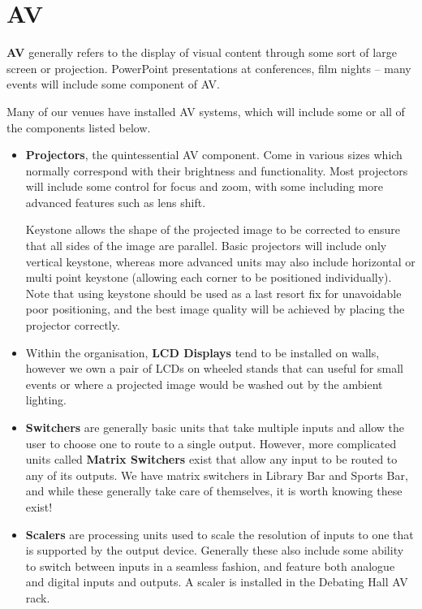 \documentclass[14pt]{article} %
\let\Oldsection\section
\renewcommand{\section}{\FloatBarrier\Oldsection}
\begin{document}
\section{AV}
\label{av}
\textbf{AV} generally refers to the display of visual content through some sort of large screen or projection. PowerPoint presentations at conferences, film nights -- many events will include some component of AV.

Many of our venues have installed AV systems, which will include some or all of the components listed below. 

\begin{itemize}
\item \textbf{Projectors}, the quintessential AV component. Come in various sizes which normally correspond with their brightness and functionality. Most projectors will include some control for focus and zoom, with some including more advanced features such as lens shift.

Keystone allows the shape of the projected image to be corrected to ensure that all sides of the image are parallel. Basic projectors will include only vertical keystone, whereas more advanced units may also include horizontal or multi point keystone (allowing each corner to be positioned individually). Note that using keystone should be used as a last resort fix for unavoidable poor positioning, and the best image quality will be achieved by placing the projector correctly.

\item Within the organisation, \textbf{LCD Displays} tend to be installed on walls, however we own a pair of LCDs on wheeled stands that can useful for small events or where a projected image would be washed out by the ambient lighting.

\item \textbf{Switchers} are generally basic units that take multiple inputs and allow the user to choose one to route to a single output. However, more complicated units called \textbf{Matrix Switchers} exist that allow any input to be routed to any of its outputs. We have matrix switchers in Library Bar and Sports Bar, and while these generally take care of themselves, it is worth knowing these exist!

\item \textbf{Scalers} are processing units used to scale the resolution of inputs to one that is supported by the output device. Generally these also include some ability to switch between inputs in a seamless fashion, and feature both analogue and digital inputs and outputs. A scaler is installed in the Debating Hall AV rack.
\end{itemize}
\end{document}
